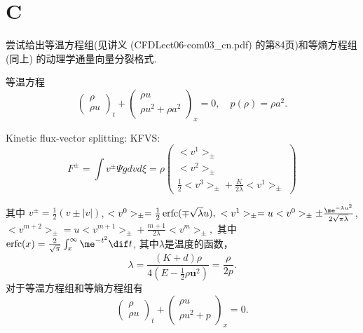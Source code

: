 \documentclass[12pt]{article}
\begin{document}
\section{C}

尝试给出等温方程组(见讲义 (CFDLect06-com03_cn.pdf) 的第84页)和等熵方程组(同上) 的动理学通量向量分裂格式.

等温方程
\begin{equation}
	\begin{pmatrix}
		\rho \\
		\rho u
	\end{pmatrix}_t
	+\begin{pmatrix}
		\rho u \\
		\rho u^2+\rho a^2
	\end{pmatrix}_x = 0,\quad p(\rho) = \rho a^2.
	\label{eq:31}
\end{equation}

Kinetic flux-vector splitting: KFVS:
\begin{equation}
	F^{\pm}=\int v^{\pm} \Psi g d v d \xi=\rho\left(\begin{array}{c}
			<v^{1}>_{\pm} \\
			<v^{2}>_{\pm} \\
			\frac{1}{2}<v^{3}>_{\pm}+\frac{K}{2 \lambda}<v^{1}>_{\pm}
		\end{array}\right)
	\label{eq:32}
\end{equation}


其中 $v^{\pm}=\frac{1}{2}(v \pm|v|)$, $<v^{0}>_{\pm}=\frac{1}{2} \operatorname{erfc}(\mp \sqrt{\lambda} u),\ <v^{1}>_{\pm}=u<v^{0}>_{\pm} \pm \frac{\me^{-\lambda u^{2}}}{2 \sqrt{\pi \lambda}}$, $<v^{m+2}>_{\pm}=u<v^{m+1}>_{\pm}+\frac{m+1}{2 \lambda}<v^{m}>_{\pm},$ 其中$ \operatorname{erfc}(x)=\frac{2}{\sqrt{\pi}} \int_{x}^{\infty} \me^{-t^{2}} \dif t$, 其中$\lambda$是温度的函数，
\begin{equation}
	\lambda=\frac{(K+d) \rho}{4\left(E-\frac{1}{2} \rho \bm{u}^{2}\right)}=\frac{\rho}{2 p}.
\end{equation}
对于等温方程组和等熵方程组有
\begin{equation}
	\begin{pmatrix}
		\rho \\
		\rho u
	\end{pmatrix}_t
	+\begin{pmatrix}
		\rho u \\
		\rho u^2+p
	\end{pmatrix}_x = 0.
\end{equation}
\end{document}

